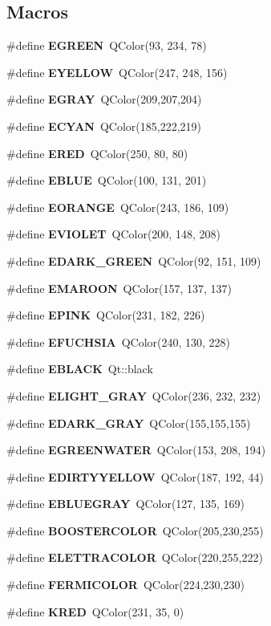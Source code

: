 \subsection*{Macros}
\begin{DoxyCompactItemize}
\item 
\#define {\bf E\+G\+R\+E\+EN}~Q\+Color(93, 234, 78)
\item 
\#define {\bf E\+Y\+E\+L\+L\+OW}~Q\+Color(247, 248, 156)
\item 
\#define {\bf E\+G\+R\+AY}~Q\+Color(209,207,204)
\item 
\#define {\bf E\+C\+Y\+AN}~Q\+Color(185,222,219)
\item 
\#define {\bf E\+R\+ED}~Q\+Color(250, 80, 80)
\item 
\#define {\bf E\+B\+L\+UE}~Q\+Color(100, 131, 201)
\item 
\#define {\bf E\+O\+R\+A\+N\+GE}~Q\+Color(243, 186, 109)
\item 
\#define {\bf E\+V\+I\+O\+L\+ET}~Q\+Color(200, 148, 208)
\item 
\#define {\bf E\+D\+A\+R\+K\+\_\+\+G\+R\+E\+EN}~Q\+Color(92, 151, 109)
\item 
\#define {\bf E\+M\+A\+R\+O\+ON}~Q\+Color(157, 137, 137)
\item 
\#define {\bf E\+P\+I\+NK}~Q\+Color(231, 182, 226)
\item 
\#define {\bf E\+F\+U\+C\+H\+S\+IA}~Q\+Color(240, 130, 228)
\item 
\#define {\bf E\+B\+L\+A\+CK}~Qt\+::black
\item 
\#define {\bf E\+L\+I\+G\+H\+T\+\_\+\+G\+R\+AY}~Q\+Color(236, 232, 232)
\item 
\#define {\bf E\+D\+A\+R\+K\+\_\+\+G\+R\+AY}~Q\+Color(155,155,155)
\item 
\#define {\bf E\+G\+R\+E\+E\+N\+W\+A\+T\+ER}~Q\+Color(153, 208, 194)
\item 
\#define {\bf E\+D\+I\+R\+T\+Y\+Y\+E\+L\+L\+OW}~Q\+Color(187, 192, 44)
\item 
\#define {\bf E\+B\+L\+U\+E\+G\+R\+AY}~Q\+Color(127, 135, 169)
\item 
\#define {\bf B\+O\+O\+S\+T\+E\+R\+C\+O\+L\+OR}~Q\+Color(205,230,255)
\item 
\#define {\bf E\+L\+E\+T\+T\+R\+A\+C\+O\+L\+OR}~Q\+Color(220,255,222)
\item 
\#define {\bf F\+E\+R\+M\+I\+C\+O\+L\+OR}~Q\+Color(224,230,230)
\item 
\#define {\bf K\+R\+ED}~Q\+Color(231, 35, 0)
\item 

\end{DoxyCompactItemize}
